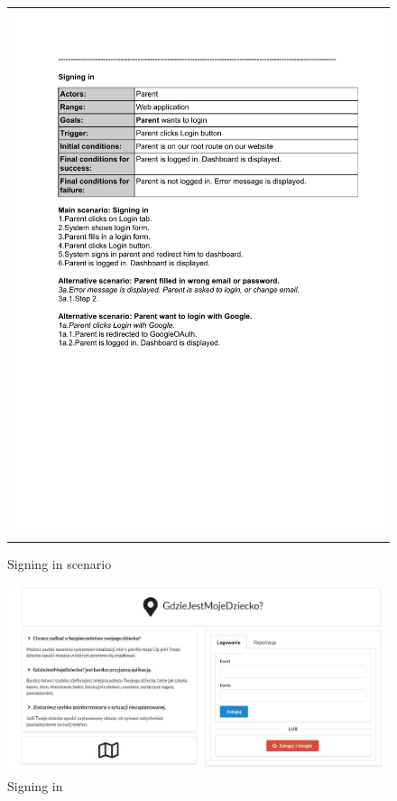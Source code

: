 \documentclass{sprawozdanie-agh}
\begin{document}
    	\begin{figure}[H]
    		\centering
    		\begin{tabular}{c}
    			\includegraphics[width=.80\textwidth]{log_cropped}
    		\end{tabular}
    		\caption{Signing in scenario}
    	\end{figure}

    	\begin{figure}[H]
    		\centering
    		\includegraphics[width=.80\textwidth]{signinIn}
    		\caption{Signing in}
    	\end{figure}
\end{document}

